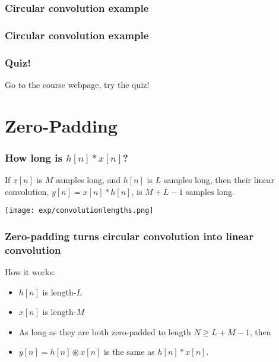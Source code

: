 \documentclass{beamer}
\begin{document}
\begin{frame}
  \frametitle{Circular convolution example}

  \centerline{}
\end{frame}

\begin{frame}
  \frametitle{Circular convolution example}

  \centerline{}
\end{frame}

\begin{frame}
  \frametitle{Quiz!}

  Go to the course webpage, try the quiz!
\end{frame}


\section[Zero-Padding]{Zero-Padding}
\setcounter{subsection}{1}

\begin{frame}
  \frametitle{How long is $h[n]\ast x[n]$?}

  If $x[n]$ is $M$ samples long, and $h[n]$ is $L$ samples long, then
  their linear convolution, $y[n] = x[n]\ast h[n]$, is $M+L-1$ samples long.
  
  \centerline{\texttt{[image: exp/convolutionlengths.png]}}
\end{frame}

\begin{frame}
  \frametitle{Zero-padding turns circular convolution into linear convolution}

  How it works:
  \begin{itemize}
  \item $h[n]$ is length-$L$
  \item $x[n]$ is length-$M$
  \item As long as they are both zero-padded to length $N\ge L+M-1$, then
  \item $y[n] = h[n]\circledast x[n]$ is the same as $h[n]\ast x[n]$.
  \end{itemize}
\end{frame}
  
\end{document}
